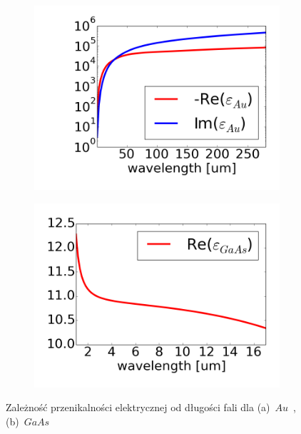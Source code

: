 \begin{figure}[htb]
	\begin{subfigure}{.45\textwidth}
		\includegraphics[width=\textwidth]{images/aueps.png}
		\caption{}
		\label{fig:aueps}
	\end{subfigure}
	\begin{subfigure}{.45\textwidth}
		\includegraphics[width=\textwidth]{images/gaaseps.png}
		\caption{}
		\label{fig:gaaseps}
	\end{subfigure}
	\caption{Zależność przenikalności elektrycznej od długości fali dla (a)~$Au$~\cite{Hagemann:75}, (b)~$GaAs$~\cite{skauli2003improved}}
\end{figure}

